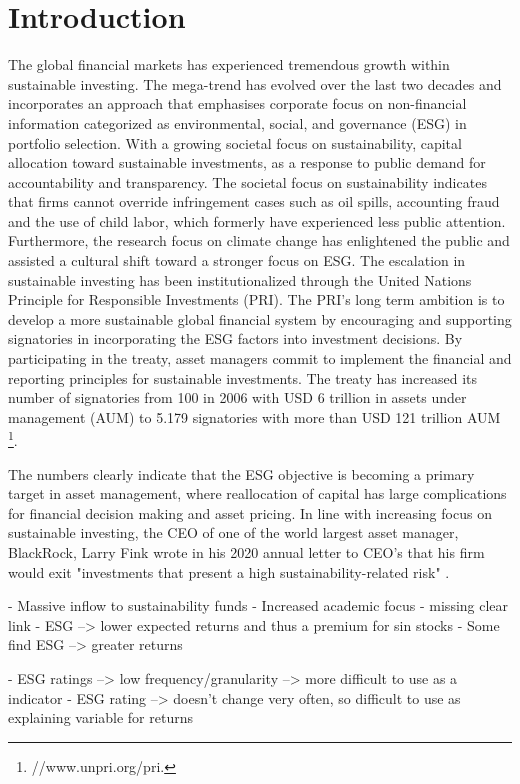 \section{Introduction} \label{sec:intro}
The global financial markets has experienced tremendous growth within sustainable investing. The mega-trend has evolved over the last two decades and incorporates an approach that emphasises corporate focus on non-financial information categorized as environmental, social, and governance (ESG) in portfolio selection. With a growing societal focus on sustainability, capital allocation toward sustainable investments, as a response to public demand for accountability and transparency. The societal focus on sustainability indicates that firms cannot override infringement cases such as oil spills, accounting fraud and the use of child labor, which formerly have experienced less public attention. Furthermore, the research focus on climate change has enlightened the public and assisted a cultural shift toward a stronger focus on ESG. The escalation in sustainable investing has been institutionalized through the United Nations Principle for Responsible Investments (PRI). The PRI's long term ambition is to develop a more sustainable global financial system by encouraging and supporting signatories in incorporating the ESG factors into investment decisions. By participating in the treaty, asset managers commit to implement the financial and reporting principles for sustainable investments. The treaty has increased its number of signatories from 100 in 2006 with USD 6 trillion in assets under management (AUM) to 5.179 signatories with more than USD 121 trillion AUM \footnote{//www.unpri.org/pri.}. 

The numbers clearly indicate that the ESG objective is becoming a primary target in asset management, where reallocation of capital has large complications for financial decision making and asset pricing. In line with increasing focus on sustainable investing, the CEO of one of the world largest asset manager, BlackRock, Larry Fink wrote in his 2020 annual letter to CEO's that his firm would exit "investments that present a high sustainability-related risk" \citep{Blackrock}. 

- Massive inflow to sustainability funds
- Increased academic focus
- missing clear link
- ESG --> lower expected returns and thus a premium for sin stocks
- Some find ESG --> greater returns


- ESG ratings --> low frequency/granularity --> more difficult to use as a indicator
- ESG rating --> doesn't change very often, so difficult to use as explaining variable for returns


